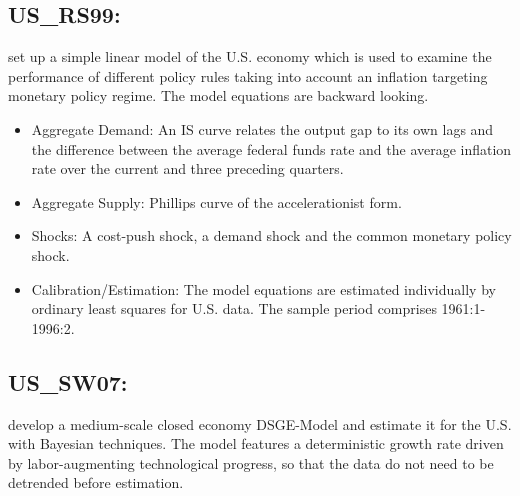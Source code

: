 \documentclass[11pt,a4paper]{article}
\begin{document}
	\subsection{US\_RS99: \cite{RudebuschSvensson1999}}
	\label{USRS99}
	\cite{RudebuschSvensson1999} set up a simple linear model of the U.S. economy which is used to examine the performance of different policy rules taking into account an inflation targeting monetary policy regime. The model equations are backward looking.
	\begin{itemize}
		\item Aggregate Demand: An IS curve relates the output gap to its own lags and the difference between the average federal funds rate and the average inflation rate over the current and three preceding quarters.
		\item Aggregate Supply: Phillips curve of the accelerationist form.
		\item Shocks: A cost-push shock, a demand shock and the common monetary policy shock.
		\item Calibration/Estimation: The model equations are estimated individually by ordinary least squares for U.S. data. The sample period comprises 1961:1-1996:2.
	\end{itemize}
	
	
	
	
	
	\subsection{US\_SW07: \cite{SmetsWouters2007}}
	\label{USSW07}
	
	
	
	\cite{SmetsWouters2007} develop a medium-scale closed economy DSGE-Model and estimate it for the U.S. with Bayesian techniques. The model features a deterministic growth rate driven by labor-augmenting technological progress, so that the data do not need to be detrended before estimation.
	
\end{document}
